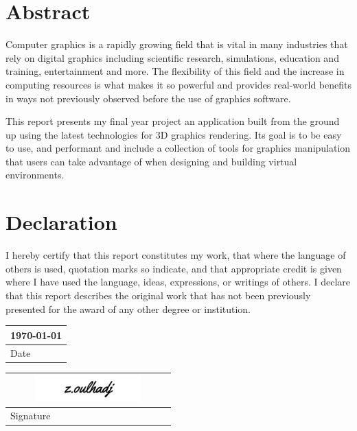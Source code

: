 \documentclass[11pt]{article}
\begin{document}
\pagebreak

\section*{Abstract}
Computer graphics is a rapidly growing field that is vital in many industries
that rely on digital graphics including scientific research, simulations,
education and training, entertainment and more. The flexibility of this field
and the increase in computing resources is what makes it so powerful and
provides real-world benefits in ways not previously observed before the use of
graphics software.

This report presents my final year project an application built from the ground
up using the latest technologies for 3D graphics rendering. Its goal is to be
easy to use, and performant and include a collection of tools for graphics
manipulation that users can take advantage of when designing and building
virtual environments.

\pagebreak

\section*{Declaration}
I hereby certify that this report constitutes my work, that where the language
of others is used, quotation marks so indicate, and that appropriate credit is
given where I have used the language, ideas, expressions, or writings of others.
I declare that this report describes the original work that has not been
previously presented for the award of any other degree or institution.

\noindent
\begin{tabular}[b]{@{} p{6cm} @{}}
\today \\
\hline
\scriptsize Date
\end{tabular}\qquad
\begin{tabular}[b]{@{} p{6cm} @{}}
\includegraphics[width=6cm,height=1cm]{images/signature.png} \\
\hline
\scriptsize Signature
\end{tabular}

\pagebreak
\tableofcontents
{}
\pagebreak


\pagebreak
\pagestyle{fancy}
\end{document}
